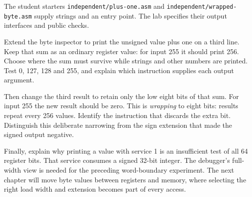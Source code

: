 The student starters \texttt{independent/plus-one.asm} and
\texttt{independent/wrapped-byte.asm} supply strings and an entry point.
The lab specifies their output interfaces and public checks.

Extend the byte inspector to print the unsigned value plus one on a third line.
Keep that sum as an ordinary register value: for input 255 it should print 256.
Choose where the sum must survive while strings and other numbers are printed.
Test 0, 127, 128 and 255, and explain which instruction supplies each output argument.

Then change the third result to retain only the low eight bits of that sum.
For input 255 the new result should be zero. This is \emph{wrapping} to eight bits:
results repeat every 256 values. Identify the instruction that discards the extra
bit. Distinguish this deliberate narrowing from the sign extension that made the
signed output negative.

Finally, explain why printing a value with service 1 is an insufficient test of
all 64 register bits. That service consumes a signed 32-bit integer. The debugger's
full-width view is needed for the preceding word-boundary experiment. The next
chapter will move byte values between registers and memory, where selecting the
right load width and extension becomes part of every access.
